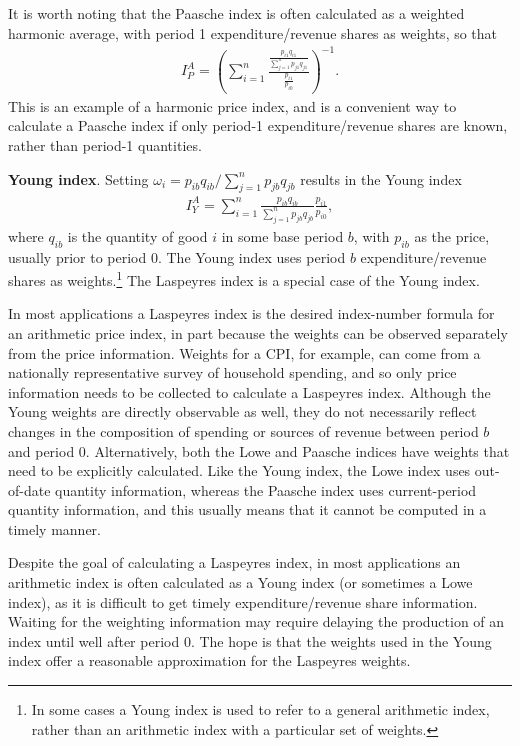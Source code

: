 \documentclass[
]{article}
\begin{document}
It is worth noting that the Paasche index is often calculated as a weighted harmonic average, with period 1 expenditure/revenue shares as weights, so that
\begin{align*}
I^{A}_{P} = \left(\sum_{i = 1}^{n} \frac{\frac{p_{i1} q_{i1}}{\sum_{j = 1}^{n} p_{j1} q_{j1}}}{\frac{p_{i1}}{p_{i0}}}\right)^{-1}.
\end{align*}
This is an example of a harmonic price index, and is a convenient way to calculate a Paasche index if only period-1 expenditure/revenue shares are known, rather than period-1 quantities.

\textbf{Young index}. Setting \(\omega_{i} = p_{ib} q_{ib} / \sum_{j = 1}^{n} p_{jb} q_{jb}\) results in the Young index
\begin{align*}
I^{A}_{Y} = \sum_{i = 1}^{n} \frac{p_{ib} q_{ib}}{\sum_{j = 1}^{n} p_{jb} q_{jb}} \frac{p_{i1}}{p_{i0}},
\end{align*}
where \(q_{ib}\) is the quantity of good \(i\) in some base period \(b\), with \(p_{ib}\) as the price, usually prior to period 0. The Young index uses period \(b\) expenditure/revenue shares as weights.\footnote{In some cases a Young index is used to refer to a general arithmetic index, rather than an arithmetic index with a particular set of weights.} The Laspeyres index is a special case of the Young index.

In most applications a Laspeyres index is the desired index-number formula for an arithmetic price index, in part because the weights can be observed separately from the price information. Weights for a CPI, for example, can come from a nationally representative survey of household spending, and so only price information needs to be collected to calculate a Laspeyres index. Although the Young weights are directly observable as well, they do not necessarily reflect changes in the composition of spending or sources of revenue between period \(b\) and period 0. Alternatively, both the Lowe and Paasche indices have weights that need to be explicitly calculated. Like the Young index, the Lowe index uses out-of-date quantity information, whereas the Paasche index uses current-period quantity information, and this usually means that it cannot be computed in a timely manner.

Despite the goal of calculating a Laspeyres index, in most applications an arithmetic index is often calculated as a Young index (or sometimes a Lowe index), as it is difficult to get timely expenditure/revenue share information. Waiting for the weighting information may require delaying the production of an index until well after period 0. The hope is that the weights used in the Young index offer a reasonable approximation for the Laspeyres weights.
\end{document}

